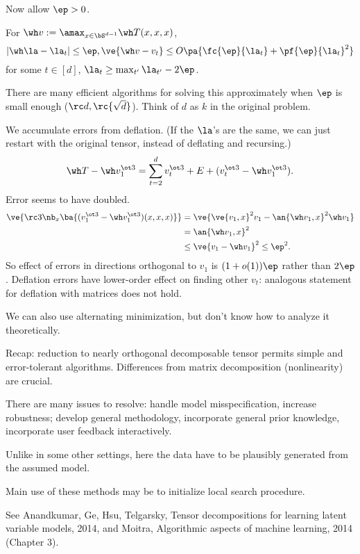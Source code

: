 Now allow $\ep>0$.  
\begin{clm}
For $\wh v:= \amax_{x\in \bS^{d-1}} \wh T(x,x,x)$,
$$
|\wh \la - \la_t|\le \ep, \ve{\wh v-v_t} \le O\pa{\fc{\ep}{\la_t} + \pf{\ep}{\la_t}^2}
$$
for some $t\in [d]$, $\la_t\ge \max_{t'}\la_{t'} - 2\ep$.
\end{clm}
There are many efficient algorithms for solving this approximately when $\ep$ is small enough ($\rc d, \rc{\sqrt d}$). Think of $d$ as $k$ in the original problem.

We accumulate errors from deflation. (If the $\la$'s are the same, we can just restart with the original tensor, instead of deflating and recursing.)
$$
\wh T - \wh v_1^{\ot 3} = \sum_{t=2}^d v_t^{\ot 3} + E + (v_t^{\ot 3} - \wh v_1^{\ot 3}).
$$
Error seems to have doubled. %
\begin{align}
\ve{\rc 3\nb_x \ba{(v_1^{\ot 3} - \wh v_1^{\ot 3})(x,x,x)}} &= \ve{\ve{v_1,x}^2 v_1-\an{\wh v_1, x}^2\wh v_1}\\
&=\an{\wh v_1,x}^2\\
&\le \ve{v_1-\wh v_1}^2 \le \ep^2.
\end{align}
So effect of errors in directions orthogonal to $v_1$ is $(1+o(1))\ep$ rather than $2\ep$. Deflation errors have lower-order effect on finding other $v_t$: analogous statement for deflation with matrices does not hold.

We can also use alternating minimization, but don't know how to analyze it theoretically.

Recap: reduction to nearly orthogonal decomposable tensor permits simple and error-tolerant algorithms. Differences from matrix decomposition (nonlinearity) are crucial.


There are many issues to resolve: handle model misspecification, increase robustness; develop general methodology, incorporate general prior knowledge, incorporate user feedback interactively.

Unlike in some other settings, here the data have to be plausibly generated from the assumed model.

Main use of these methods may be to initialize local search procedure.

See Anandkumar, Ge, Hsu, Telgarsky, Tensor decompositions for learning latent variable models, 2014, and Moitra, Algorithmic aspects of machine learning, 2014 (Chapter 3).

